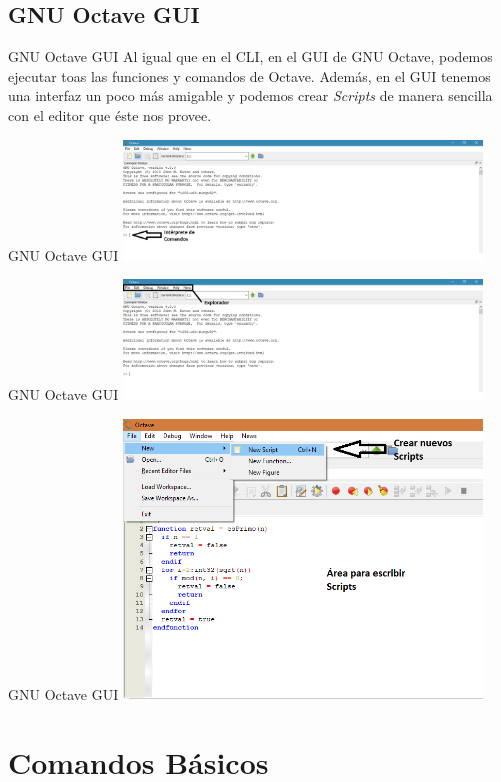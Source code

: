 \documentclass[12pt]{beamer}
\begin{document}
\subsection{GNU Octave GUI}
\begin{frame}{GNU Octave GUI}
Al igual que en el CLI, en el GUI de GNU Octave, podemos ejecutar toas las funciones y comandos de Octave. Además, en el GUI tenemos una interfaz un poco más amigable y podemos crear \textit{Scripts} de manera sencilla con el editor que éste nos provee.
\end{frame}
\begin{frame}{GNU Octave GUI}
\includegraphics[width=270pt]{images/inter.png}
\end{frame}
\begin{frame}{GNU Octave GUI}
\includegraphics[width=270pt]{images/explor.png}
\end{frame}
\begin{frame}{GNU Octave GUI}
\includegraphics[width=270pt]{images/scripts.png}
\end{frame}
\section{Comandos Básicos}
\end{document}
